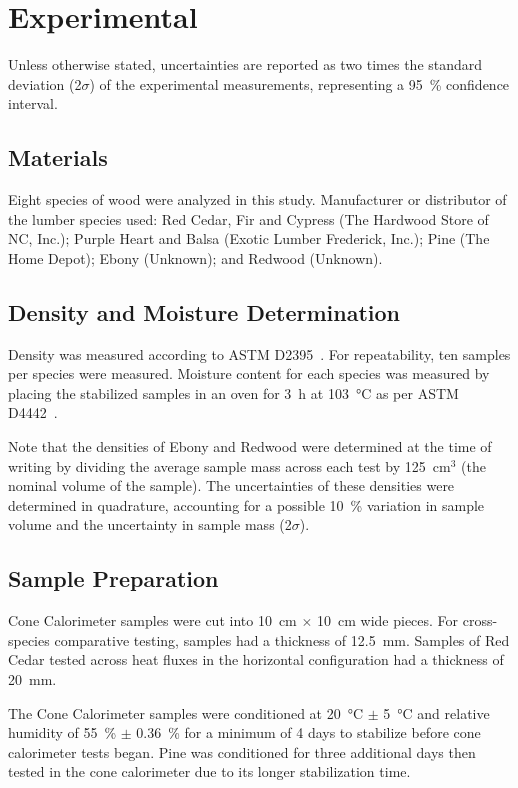 \documentclass[12pt]{article}
\begin{document}
\section{Experimental}
\label{sec:experimental}
Unless otherwise stated, uncertainties are reported as two times the standard deviation (2$\sigma$) of the experimental measurements, representing a 95~\% confidence interval.

\subsection{Materials}
\label{ssec:materials}
Eight species of wood were analyzed in this study. Manufacturer or distributor of the lumber species used: Red Cedar, Fir and Cypress (The Hardwood Store of NC, Inc.); Purple Heart and Balsa (Exotic Lumber Frederick, Inc.); Pine (The Home Depot); Ebony (Unknown); and Redwood (Unknown).

\subsection{Density and Moisture Determination}
\label{ssec:density}
Density was measured according to ASTM D2395~\cite{astm_d2395}. For repeatability, ten samples per species were measured. Moisture content for each species was measured by placing the stabilized samples in an oven for 3~h at 103~°C as per ASTM D4442~\cite{astm_d4442}. 

Note that the densities of Ebony and Redwood were determined at the time of writing by dividing the average sample mass across each test by 125~cm$^{3}$ (the nominal volume of the sample). The uncertainties of these densities were determined in quadrature, accounting for a possible 10~\% variation in sample volume and the uncertainty in sample mass (2$\sigma$).

\subsection{Sample Preparation}
\label{ssec:sample_prep}
Cone Calorimeter samples were cut into 10~cm $\times$ 10~cm wide pieces. For cross-species comparative testing, samples had a thickness of 12.5~mm. Samples of Red Cedar tested across heat fluxes in the horizontal configuration had a thickness of 20~mm.

The Cone Calorimeter samples were conditioned at 20~°C $\pm$ 5~°C and relative humidity of 55~\% $\pm$ 0.36~\% for a minimum of 4 days to stabilize before cone calorimeter tests began. Pine was conditioned for three additional days then tested in the cone calorimeter due to its longer stabilization time.
\end{document}
